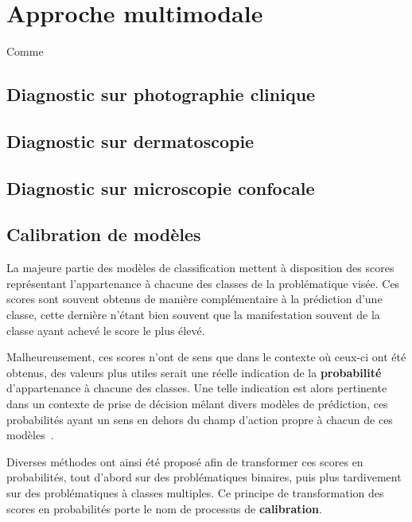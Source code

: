 \renewcommand{\thechapter}{\arabic{chapter}}
\setcounter{chapter}{6}

\chapter{Approche multimodale}
\label{chap:chapter_7}
\chapterintro
Comme 	
\newpage

\section{Diagnostic sur photographie clinique}
\section{Diagnostic sur dermatoscopie}
\section{Diagnostic sur microscopie confocale}

\section{Calibration de modèles}
La majeure partie des modèles de classification mettent à disposition des scores représentant l'appartenance à chacune des classes de la problématique visée. Ces scores sont souvent obtenus de manière complémentaire à la prédiction d'une classe, cette dernière n'étant bien souvent que la manifestation souvent de la classe ayant achevé le score le plus élevé.\par

Malheureusement, ces scores n'ont de sens que dans le contexte où ceux-ci ont été obtenus, des valeurs plus utiles serait une réelle indication de la \textbf{probabilité} d'appartenance à chacune des classes. Une telle indication est alors pertinente dans un contexte de prise de décision mêlant divers modèles de prédiction, ces probabilités ayant un sens en dehors du champ d'action propre à chacun de ces modèles~\cite{Zadrozny2002}.\par

Diverses méthodes ont ainsi été proposé afin de transformer ces scores en probabilités, tout d'abord sur des problématiques binaires, puis plus tardivement sur des problématiques à classes multiples. Ce principe de transformation des scores en probabilités porte le nom de processus de \textbf{calibration}.\par

